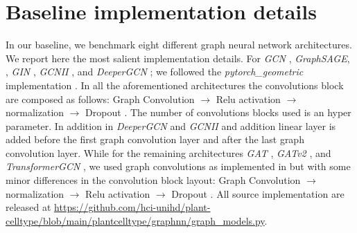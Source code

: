 \documentclass[10pt,twocolumn,letterpaper]{article}
\begin{document}
\section{Baseline implementation details} 
In our baseline, we benchmark eight different graph neural network architectures. We report here the most salient implementation details. 
For \textit{GCN} \cite{kipf2016semi}, \textit{GraphSAGE}, \cite{hamilton2017inductive}, \textit{GIN} \cite{xu2018powerful}, \textit{GCNII} \cite{chen2020simple}, and \textit{DeeperGCN} \cite{li2019deepgcns, li2020deepergcn}; we followed the 
\textit{pytorch\_geometric} implementation \cite{Fey2019}. In all the aforementioned architectures the convolutions block are composed as follows: Graph Convolution $\rightarrow$ Relu activation \cite{agarap2018deep} $\rightarrow$ normalization $\rightarrow$ Dropout \cite{srivastava2014dropout}. The number of convolutions blocks used is an hyper parameter. In addition in \textit{DeeperGCN} and \textit{GCNII} and addition linear layer is added before the first graph convolution layer and after the last graph convolution layer. While for the remaining architectures \textit{GAT} \cite{velickovic2018graph}, \textit{GATv2} \cite{brody2021attentive}, and  \textit{TransformerGCN} \cite{vaswani2017attention, shi2020masked}, we used graph convolutions as implemented in \cite{Fey2019} but with some minor differences in the convolution block layout: Graph Convolution $\rightarrow$ normalization $\rightarrow$ Relu activation \cite{agarap2018deep} $\rightarrow$ Dropout \cite{srivastava2014dropout}. All source implementation are released at \url{https://github.com/hci-unihd/plant-celltype/blob/main/plantcelltype/graphnn/graph_models.py}.
\end{document}
